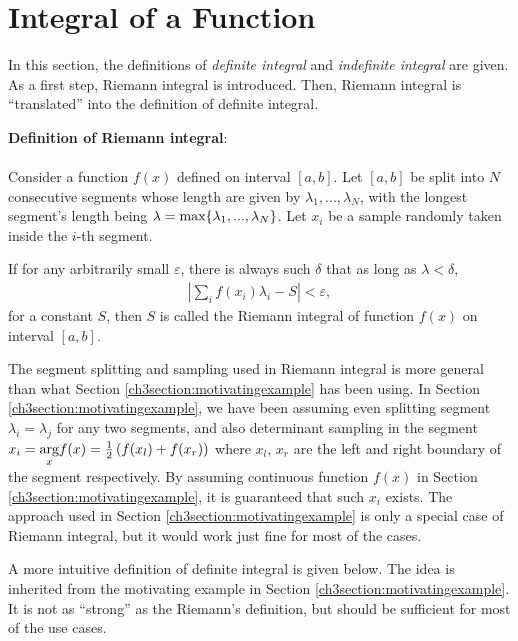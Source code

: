 \section{Integral of a Function} \label{ch3sec:integraloffunc}

In this section, the definitions of \textit{definite integral} and \textit{indefinite integral} are given. As a first step, Riemann integral is introduced. Then, Riemann integral is ``translated'' into the definition of definite integral.

\begin{VF}
\textbf{Definition of Riemann integral}:
\\
\\
Consider a function $f(x)$ defined on interval $[a, b]$. Let $[a, b]$ be split into $N$ consecutive segments whose length are given by $\lambda_1,...,\lambda_N$, with the longest segment's length being $\lambda = \textup{max}\{\lambda_1,...,\lambda_N\}$. Let $x_i$ be a sample randomly taken inside the $i$-th segment.

If for any arbitrarily small $\varepsilon$, there is always such $\delta$ that as long as $\lambda < \delta$,
\begin{eqnarray}
    \left|\sum_{i}f(x_i)\lambda_i - S\right| < \varepsilon, \nonumber
\end{eqnarray}
for a constant $S$, then $S$ is called the Riemann integral of function $f(x)$ on interval $[a, b]$.

\end{VF}

The segment splitting and sampling used in Riemann integral is more general than what Section \ref{ch3section:motivatingexample} has been using. In Section \ref{ch3section:motivatingexample}, we have been assuming even splitting segment $\lambda_i = \lambda_j$ for any two segments, and also determinant sampling in the segment $x_i = \underset{x}{\operatorname{\textup{arg}}} f(x) = \frac{1}{2}\left(f(x_l) + f(x_r)\right)$ where $x_l$, $x_r$ are the left and right boundary of the segment respectively. By assuming continuous function $f(x)$ in Section \ref{ch3section:motivatingexample}, it is guaranteed that such $x_i$ exists. The approach used in Section \ref{ch3section:motivatingexample} is only a special case of Riemann integral, but it would work just fine for most of the cases.

A more intuitive definition of definite integral is given below. The idea is inherited from the motivating example in Section \ref{ch3section:motivatingexample}. It is not as ``strong'' as the Riemann's definition, but should be sufficient for most of the use cases.


